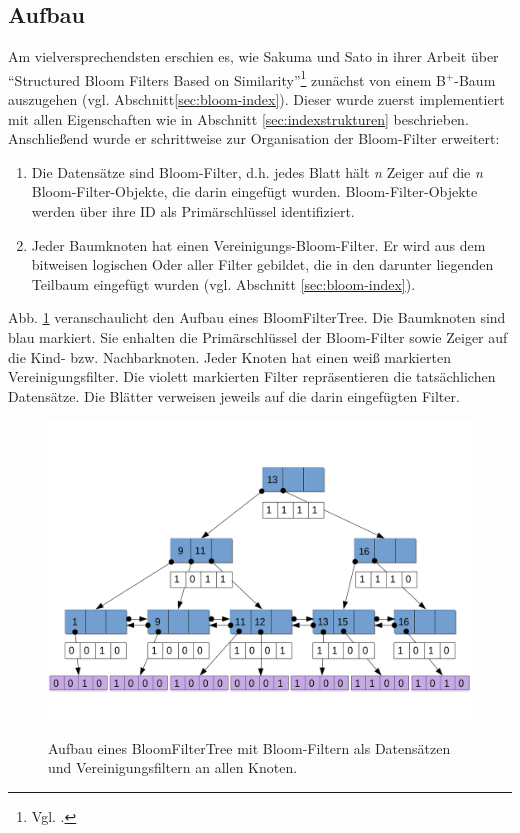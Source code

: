 \subsection{Aufbau}\label{sec:aufbau} 
Am vielversprechendsten erschien es, wie Sakuma und Sato in ihrer Arbeit über "`Structured Bloom Filters Based on Similarity"'\footnote{Vgl. \cite{Sakuma2011}.} zunächst von einem B$^+$-Baum auszugehen (vgl. Abschnitt\ref{sec:bloom-index}). Dieser wurde zuerst implementiert mit allen Eigenschaften wie in Abschnitt \ref{sec:indexstrukturen} beschrieben. Anschließend wurde er schrittweise zur Organisation der Bloom-Filter erweitert: 
\begin{enumerate}
	\item Die Datensätze sind Bloom-Filter, d.h. jedes Blatt hält \textit{n} Zeiger auf die \textit{n} Bloom-Filter-Objekte, die darin eingefügt wurden. Bloom-Filter-Objekte werden über ihre ID als Primärschlüssel identifiziert. 
	\item Jeder Baumknoten hat einen Vereinigungs-Bloom-Filter. Er wird aus dem bitweisen logischen Oder aller Filter gebildet, die in den darunter liegenden Teilbaum eingefügt wurden (vgl. Abschnitt \ref{sec:bloom-index}).
\end{enumerate}
Abb. \ref{fig:pic6} veranschaulicht den Aufbau eines BloomFilterTree. Die Baumknoten sind blau markiert. Sie enhalten die Primärschlüssel der Bloom-Filter sowie Zeiger auf die Kind- bzw. Nachbarknoten. Jeder Knoten hat einen weiß markierten Vereinigungsfilter. Die violett markierten Filter repräsentieren die tatsächlichen Datensätze. Die Blätter verweisen jeweils auf die darin eingefügten Filter.
\begin{figure}[hpbt]
  \centering
  \includegraphics[width=1.0\textwidth]{pictures/bloom-filter-tree.png}\\
  \caption[Aufbau eines BloomFilterTree]{Aufbau eines BloomFilterTree mit Bloom-Filtern als Datensätzen und Vereinigungsfiltern an allen Knoten.}\label{fig:pic6}
\end{figure}
